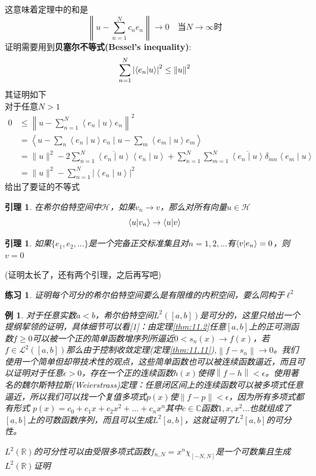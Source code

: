 \documentclass[hyperref,UTF8]{ctexbook}
\newtheorem{eg}{例}[chapter]
\newtheorem*{exercise}{练习}
\newtheorem{lemma}[theorem]{引理}
\begin{document}
这意味着定理中的和是
\[\left\lVert u-\sum_{n=1}^{N}c_n e_n\right\rVert\rightarrow0 \quad\text{当}N\rightarrow \infty \text{时}\]
证明需要用到\textbf{贝塞尔不等式(Bessel’s inequality)}:
\begin{equation}
    \sum_{n=1}^{N}\left\lvert \braket{e_n|u} \right\rvert^2 \leq \left\lVert u\right\rVert^2\label{eq:13.5}
\end{equation}
其证明如下\\
对于任意\(N>1\)
$$
\begin{aligned}
0 & \leq\left\|u-\sum_{n=1}^{N}\left\langle e_{n} \mid u\right\rangle e_{n}\right\|^{2} \\
&=\left\langle u-\sum_{n}\left\langle e_{n} \mid u\right\rangle e_{n} \mid u-\sum_{m}\left\langle e_{m} \mid u\right\rangle e_{m}\right\rangle \\
&=\|u\|^{2}-2 \sum_{n=1}^{N} \overline{\left\langle e_{n} \mid u\right\rangle}\left\langle e_{n} \mid u\right\rangle+\sum_{n=1}^{N} \sum_{m=1}^{N} \overline{\left\langle e_{n} \mid u\right\rangle} \delta_{m n}\left\langle e_{m} \mid u\right\rangle \\
&=\|u\|^{2}-\sum_{n=1}^{N}\left|\left\langle e_{n} \mid u\right\rangle\right|^{2}
\end{aligned}
$$
给出了要证的不等式
\begin{lemma}\label{lema:13.3}
    在希尔伯特空间中\(\mathcal{H}\)，如果\(v_n\rightarrow v\)，那么对所有向量\(u\in \mathcal{H}\)    
    \[\braket{u|v_n}\rightarrow\braket{u|v}\]
\end{lemma}
\begin{lemma}\label{lema:13.4}
    如果\(\{e_1,e_2,...\}\)是一个完备正交标准集且对\(n=1,2,...\)有\(\braket{v|e_n}=0\)，则\(v=0\)
\end{lemma}
(证明太长了，还有两个引理，之后再写吧)
\begin{exercise}
    证明每个可分的希尔伯特空间要么是有限维的内积空间，要么同构于\(\ell^2\)
\end{exercise}
\begin{eg}\label{eg:13.5}
    对于任意实数\(a<b\)，希尔伯特空间\(L^2([a,b])\)是可分的，这里只给出一个提纲挈领的证明，具体细节可以看[1]：由定理\ref{thm:11.2}任意\([a,b]\)上的正可测函数\(f\geq 0\)可以被一个正的简单函数增序列所逼近\(0<s_n(x)\rightarrow f(x)\)，若\(f\in \mathcal{L}^2([a,b])\)那么由于控制收敛定理(定理\ref{thm:11.11}),\(\left\lVert f-s_n\right\rVert \rightarrow 0\)。我们使用一个简单但却带技术性的观点，这些简单函数也可以被连续函数逼近，而且可以证明对于任意\(\epsilon>0\)，存在一个正的连续函数\(h(x)\)使得\(\left\lVert f-h\right\rVert <\epsilon\)。使用著名的魏尔斯特拉斯(Weierstrass)定理：任意闭区间上的连续函数可以被多项式任意逼近，所以我们可以找一个复值多项式\(p(x)\)使\(\left\lVert f-p\right\rVert <\epsilon\)，因为所有多项式都有形式
    \(p(x)=c_0+c_1 x+c_2 x^2+...+c_n x^n\)其中\(c\in \mathbb{C}\)函数\(1,x,x^2...\)也就组成了\([a,b]\)上的可数函数序列，而且可以生成\(L^2[a,b]\)，这就证明了\(L^2[a,b]\)的可分性。

    \(L^2(\mathbb{R})\)的可分性可以由受限多项式函数\(f_{n,N}=x^n \chi_{[-N,N]}\)是一个可数集且生成\(L^2(\mathbb{R})\)证明
\end{eg}
\end{document}
